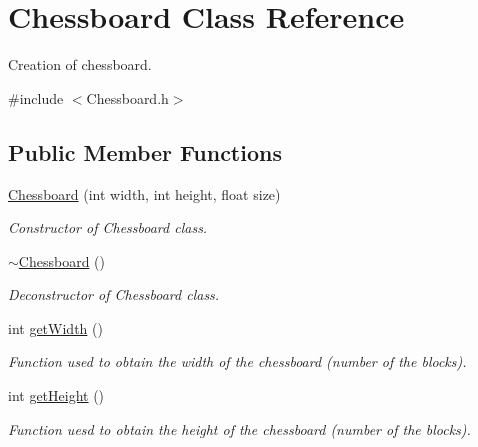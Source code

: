 \hypertarget{classChessboard}{}\section{Chessboard Class Reference}
\label{classChessboard}


Creation of chessboard.  




{\ttfamily \#include $<$Chessboard.\+h$>$}

\subsection*{Public Member Functions}
\begin{DoxyCompactItemize}
\item 
\hyperlink{classChessboard_aa80499df26acccc4fd9d6449c1d847f0}{Chessboard} (int width, int height, float size)
\begin{DoxyCompactList}\small\item\em Constructor of Chessboard class. \end{DoxyCompactList}\item 
\mbox{\label{classChessboard_a53eac522998d8d92cca409493c773f54}} 
\hyperlink{classChessboard_a53eac522998d8d92cca409493c773f54}{$\sim$\+Chessboard} ()
\begin{DoxyCompactList}\small\item\em Deconstructor of Chessboard class. \end{DoxyCompactList}\item 
\mbox{\label{classChessboard_aeecfc5f0c890fec1db2a45619332459b}} 
int \hyperlink{classChessboard_aeecfc5f0c890fec1db2a45619332459b}{get\+Width} ()
\begin{DoxyCompactList}\small\item\em Function used to obtain the width of the chessboard (number of the blocks). \end{DoxyCompactList}\item 
\mbox{\label{classChessboard_a5cbb8122bc0f8fc08d82e0541e01f7da}} 
int \hyperlink{classChessboard_a5cbb8122bc0f8fc08d82e0541e01f7da}{get\+Height} ()
\begin{DoxyCompactList}\small\item\em Function uesd to obtain the height of the chessboard (number of the blocks). \end{DoxyCompactList}\item 

\end{DoxyCompactItemize}
